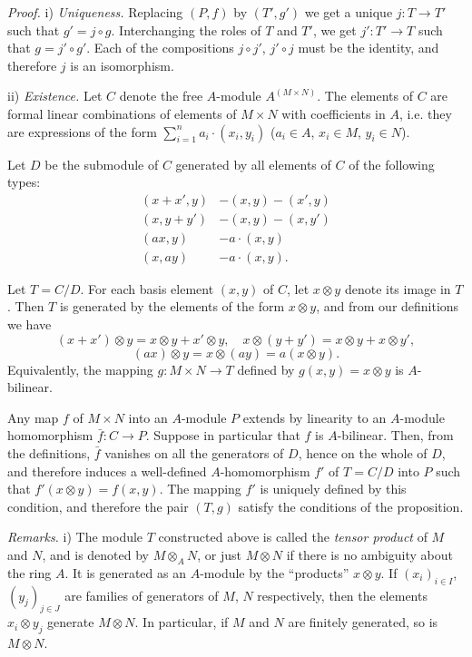 \noindent\textit{Proof.} i) \textit{Uniqueness.} Replacing $(P,f)$ by $(T',g')$ we get a unique $j:T\longrightarrow T'$ such that $g'=j\circ g$. Interchanging the roles of $T$ and $T'$, we get $j':T'\longrightarrow T$ such that $g=j'\circ g'$. Each of the compositions $j\circ j'$, $j'\circ j$ must be the identity, and therefore $j$ is an isomorphism.

ii) \textit{Existence.} Let $C$ denote the free $A$-module $A^{(M\times N)}$. The elements of $C$ are formal linear combinations of elements of $M\times N$ with coefficients in $A$, i.e. they are expressions of the form $\sum_{i=1}^n a_i\cdot(x_i,y_i)$ ($a_i\in A$, $x_i\in M$, $y_i\in N$).

Let $D$ be the submodule of $C$ generated by all elements of $C$ of the following types:
\[
\begin{split}
(x+x',y)&-(x,y)-(x',y)\\
(x,y+y')&-(x,y)-(x,y')\\
(ax,y)&-a\cdot(x,y)\\
(x,ay)&-a\cdot(x,y).
\end{split}
\]

Let $T=C/D$. For each basis element $(x,y)$ of $C$, let $x\otimes y$ denote its image in $T$. Then $T$ is generated by the elements of the form $x\otimes y$, and from our definitions we have
\[
 (x+x')\otimes y=x\otimes y+x'\otimes y,\quad x\otimes(y+y')=x\otimes y+x\otimes y',
\]
\[
 (ax)\otimes y=x\otimes(ay)=a(x\otimes y).
\]
Equivalently, the mapping $g:M\times N\longrightarrow T$ defined by $g(x,y)=x\otimes y$ is $A$-bilinear.

Any map $f$ of $M\times N$ into an $A$-module $P$ extends by linearity to an $A$-module homomorphism $\bar f:C\longrightarrow P$. Suppose in particular that $f$ is $A$-bilinear. Then, from the definitions, $\bar f$ vanishes on all the generators of $D$, hence on the whole of $D$, and therefore induces a well-defined $A$-homomorphism $f'$ of $T=C/D$ into $P$ such that $f'(x\otimes y)=f(x,y)$. The mapping $f'$ is uniquely defined by this condition, and therefore the pair $(T,g)$ satisfy the conditions of the proposition. \proofbox

\noindent\textit{Remarks.} i) The module $T$ constructed above is called the \textit{tensor product} of $M$ and $N$, and is denoted by $M\otimes_A N$, or just $M\otimes N$ if there is no ambiguity about the ring $A$. It is generated as an $A$-module by the ``products'' $x\otimes y$. If $(x_i)_{i\in I}$, $(y_j)_{j\in J}$ are families of generators of $M$, $N$ respectively, then the elements $x_i\otimes y_j$ generate $M\otimes N$. In particular, if $M$ and $N$ are finitely generated, so is $M\otimes N$.

